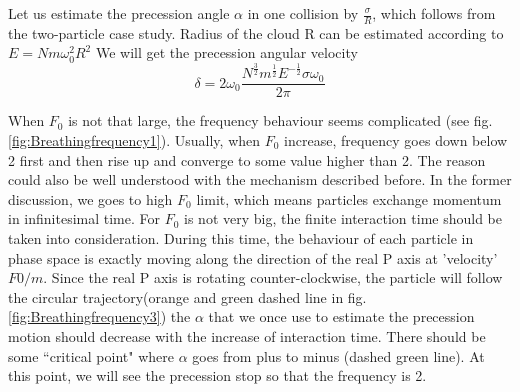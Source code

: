 \documentclass[aps,pre,twocolumn
,groupedaddress]{revtex4-1}
\begin{document}
Let us estimate the precession angle $\alpha$ in one collision by $\frac{\sigma}{R}$, which follows from the two-particle case study. Radius of the cloud R can be estimated according to $E=Nm\omega_0^2R^2$
We will get the precession angular velocity 
\begin{equation}
\delta=2\omega_0\frac{N^\frac{3}{2}m^{\frac{1}{2}}E^{-\frac{1}{2}}\sigma\omega_0}{2\pi}
\label{eq:breathingfrequency1}
\end{equation}

\begin{comment}
\begin{figure}
\texttt{[image: D:/matlab2016/MolecularDynamics/figure/latexpic/N=5\_freq\_at\_F0=10000\_fitting.eps]}
\caption{Frequency measured at N=5} 
Since the prediction is only an estimation by order, which means there could be some extra effective coefficient before the R. In view of this, the result is satisfying.


\texttt{[image: D:/matlab2016/MolecularDynamics/figure/latexpic/N=5\_freq\_at\_F0=10000\_sup1.eps]}
\texttt{[image: D:/matlab2016/MolecularDynamics/figure/latexpic/N=5\_freq\_at\_F0=10000\_sup2.eps]}
\caption{Spectrum at the beginning and the end of measurement}
 Two spectrum above show the error of our frequency measurement. The line width of the peak is significant compared with the $\delta$. The peak width comes from FT in finite time.
\end{figure}


\begin{figure}
\centering
\texttt{[image: D:/matlab2016/MolecularDynamics/figure/latexpic/N=20\_freq\_at\_F0=10000\_2.eps]}
\caption{N=20}
\texttt{[image: D:/matlab2016/MolecularDynamics/figure/latexpic/N=20\_freq\_at\_F0=10000\_2\_sup1.eps]}
\texttt{[image: D:/matlab2016/MolecularDynamics/figure/latexpic/N=20\_freq\_at\_F0=10000\_2\_sup2.eps]}
\end{figure}
\end{comment}
{\color{red}{Here, I hide some figures showing the error of Fourier transform.}}


When $F_0$ is not that large, the frequency behaviour seems complicated (see fig.\ref{fig:Breathingfrequency1}). Usually, when $F_0$ increase, frequency goes down below 2 first and then rise up and converge to some value higher than 2. The reason could also be well understood with the mechanism described before. In the former discussion, we goes to high $F_0$ limit, which means particles exchange momentum in infinitesimal time. For $F_0$ is not very big, the finite interaction time should be taken into consideration. During this time, the behaviour of each particle in phase space is exactly moving along the direction of the real P axis at 'velocity' $F0/m$. Since the real P axis is rotating counter-clockwise, the particle will follow the circular trajectory(orange and green dashed line in fig.\ref{fig:Breathingfrequency3}) the $\alpha$ that we once use to estimate the precession motion should decrease with the increase of interaction time. There should be some ``critical point" where $\alpha$ goes from plus to minus (dashed green line). At this point, we will see the precession stop so that the frequency is 2. 
\end{document}
